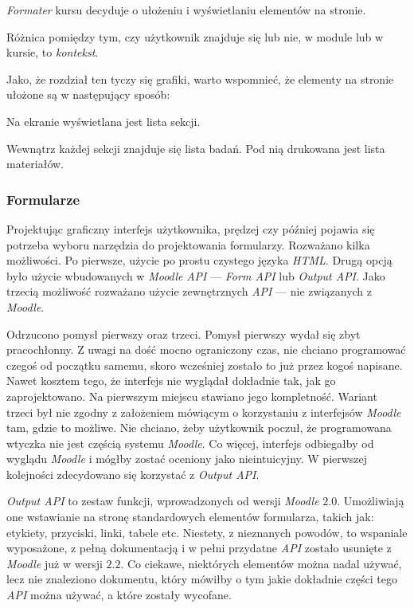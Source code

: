 \documentclass[12pt]{report}
\begin{document}
\emph{Formater} kursu decyduje o ułożeniu i wyświetlaniu elementów na stronie.

Różnica pomiędzy tym, czy użytkownik znajduje się lub nie, w module lub w kursie, to \emph{kontekst}.

Jako, że rozdział ten tyczy się grafiki, warto wspomnieć, że elementy na stronie ułożone są w następujący sposób:
\begin{description}
\item Na ekranie wyświetlana jest lista sekcji.
\item Wewnątrz każdej sekcji znajduje się lista badań. Pod nią drukowana jest lista materiałów.
\end{description}

\subsubsection{Formularze}
Projektując graficzny interfejs użytkownika, prędzej czy później pojawia się potrzeba wyboru narzędzia do projektowania formularzy. Rozważano kilka możliwości. Po pierwsze, użycie po prostu czystego języka \emph{HTML}. Drugą opcją było użycie wbudowanych w \emph{Moodle} \emph{API} --- \emph{Form API} lub \emph{Output API}. Jako trzecią możliwość rozważano użycie zewnętrznych \emph{API} --- nie związanych z \emph{Moodle}.

Odrzucono pomysł pierwszy oraz trzeci. Pomysł pierwszy wydał się zbyt pracochłonny. Z uwagi na dość mocno ograniczony czas, nie chciano programować czegoś od początku samemu, skoro wcześniej zostało to już przez kogoś napisane. Nawet kosztem tego, że interfejs nie wyglądał dokładnie tak, jak go zaprojektowano. Na pierwszym miejscu stawiano jego kompletność. Wariant trzeci był nie zgodny z założeniem mówiącym o korzystaniu z interfejsów \emph{Moodle} tam, gdzie to możliwe. Nie chciano, żeby użytkownik poczuł, że programowana wtyczka nie jest częścią systemu \emph{Moodle}. Co więcej, interfejs odbiegałby od wyglądu \emph{Moodle} i mógłby zostać oceniony jako nieintuicyjny. W pierwszej kolejności zdecydowano się korzystać z \emph{Output API}.

\emph{Output API} to zestaw funkcji, wprowadzonych od wersji \emph{Moodle} $2.0$. Umożliwiają one wstawianie na stronę standardowych elementów formularza, takich jak: etykiety, przyciski, linki, tabele etc. Niestety, z nieznanych powodów, to wspaniale wyposażone, z pełną dokumentacją i w pełni przydatne \emph{API} zostało usunięte z \emph{Moodle} już w wersji $2.2$. Co ciekawe, niektórych elementów można nadal używać, lecz nie znaleziono dokumentu, który mówiłby o tym jakie dokładnie części tego \emph{API} można używać, a które zostały wycofane.
\end{document}
